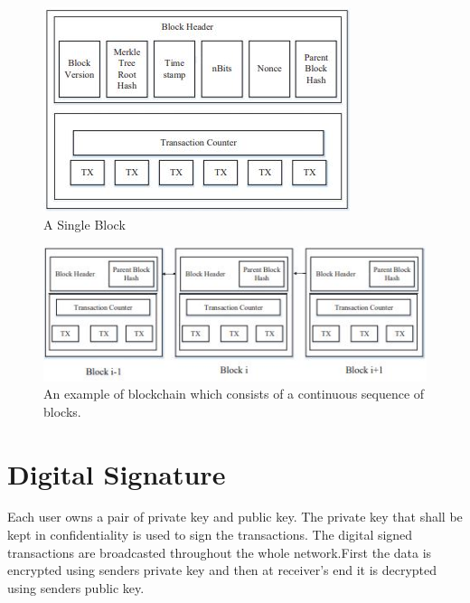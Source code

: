 \documentclass[12pt]{report}
\begin{document}
\begin{figure}
    \centering
    \includegraphics{Blockchain-2.JPG}
    \caption{A Single Block}
    \label{fig:my_label}
\end{figure}
\newpage
\begin{figure}
    \centering
    \includegraphics{Blockchain-1.JPG}
    \caption{ An example of blockchain which consists of a continuous
sequence of blocks.}
    \label{fig:my_label}
\end{figure}
\section{Digital Signature}
\par Each user owns a pair of private key and public key.
The private key that shall be kept in confidentiality is used
to sign the transactions. The digital signed transactions are
broadcasted throughout the whole network.First the data is encrypted using senders private key and then at receiver's end it is decrypted using senders public key.
\end{document}
